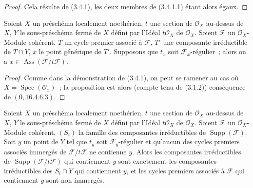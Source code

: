 \begin{proof}
Cela résulte de (3.4.1), les deux membres de (3.4.1.1) étant alors égaux.
\end{proof}

\begin{proposition}[3.4.3]
\label{IV.2.3.4.3-fr}
Soient $X$ un préschéma localement noethérien, $t$ une section de
$\mathcal O_X$ au-dessus de $X$, $Y$ le sous-préschéma fermé de $X$ défini par
l'Idéal $t\mathcal O_X$ de $\mathcal O_X$. Soient $\mathcal F$ un
$\mathcal O_X$-Module cohérent, $T$ un cycle premier associé à $\mathcal F$,
$T'$ une composante irréductible de $T\cap Y$, $x$ le point générique de
$T'$. Supposons que $t_x$ soit $\mathcal F_x$-régulier~; alors on a
$x\in\operatorname{Ass}(\mathcal F/t\mathcal F)$.
\end{proposition}

\begin{proof}
Comme dans la démonstration de (3.4.1), on peut se ramener au cas où
$X=\operatorname{Spec}(\mathcal O_x)$~; la proposition est alors (compte tenu
de (3.1.2)) conséquence de $(0,16.4.6.3)$.
\end{proof}

\begin{proposition}[3.4.4]
\label{IV.2.3.4.4-fr}
Soient $X$ un préschéma localement noethérien, $t$ une section de
$\mathcal O_X$ au-dessus de $X$, $Y$ le sous-préschéma fermé de $X$ défini par
l'Idéal $t\mathcal O_X$ de $\mathcal O_X$. Soient $\mathcal F$ un
$\mathcal O_X$-Module cohérent, $(S_i)$ la famille des composantes
irréductibles de $\operatorname{Supp}(\mathcal F)$. Soit $y$ un point de $Y$
tel que $t_y$ soit $\mathcal F_y$-régulier et qu'aucun des cycles premiers
associés immergés de $\mathcal F/t\mathcal F$ ne contienne $y$. Alors les
composantes irréductibles de $\operatorname{Supp}(\mathcal F/t\mathcal F)$ qui
contiennent $y$ sont exactement les composantes irréductibles des $S_i\cap Y$
qui contiennent $y$, et les cycles premiers associés à $\mathcal F$ qui
contiennent $y$ sont non immergés.
\end{proposition}

